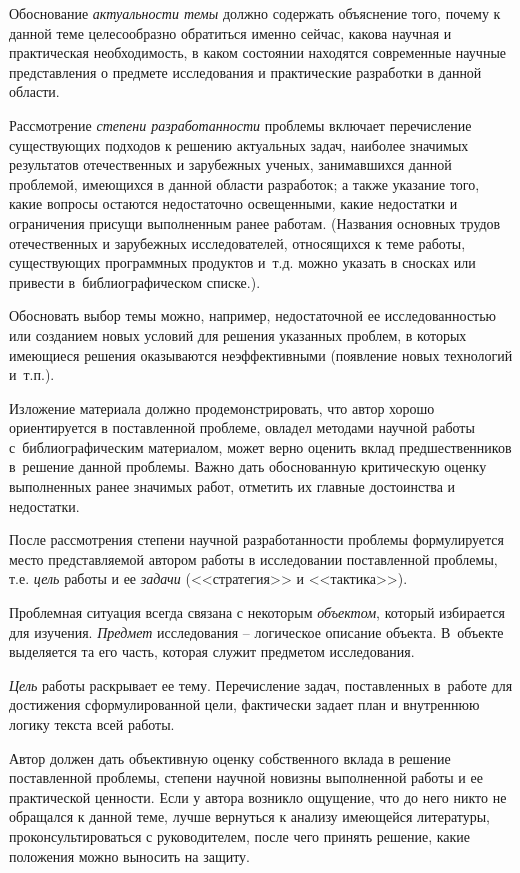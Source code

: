 \documentclass[PI,VKR]{HSEUniversity}
\begin{document}
Обоснование \emph{актуальности темы} должно содержать объяснение того, почему к данной теме целесообразно обратиться именно сейчас, какова научная и практическая необходимость, в каком состоянии находятся современные научные представления о предмете исследования и практические разработки в данной области.

Рассмотрение \emph{степени разработанности} проблемы включает перечисление существующих подходов к решению актуальных задач, наиболее значимых результатов отечественных и зарубежных ученых, занимавшихся данной проблемой, имеющихся в данной области разработок; а также указание того, какие вопросы остаются недостаточно освещенными, какие недостатки и ограничения присущи выполненным ранее работам. (Названия основных трудов отечественных и зарубежных исследователей, относящихся к теме работы, существующих программных продуктов и т.д. можно указать в сносках или привести в библиографическом списке.).

Обосновать выбор темы можно, например, недостаточной ее исследованностью или созданием новых условий для решения указанных проблем, в которых имеющиеся решения оказываются неэффективными (появление новых технологий и т.п.).

Изложение материала должно продемонстрировать, что автор хорошо ориентируется в поставленной проблеме, овладел методами научной работы с библиографическим материалом, может верно оценить вклад предшественников в решение данной проблемы. Важно дать обоснованную критическую оценку выполненных ранее значимых работ, отметить их главные достоинства и недостатки. 

После рассмотрения степени научной разработанности проблемы формулируется место представляемой автором работы в исследовании поставленной проблемы, т.е. \emph{цель} работы и ее \emph{задачи} (<<стратегия>> и <<тактика>>).

Проблемная ситуация всегда связана с некоторым \emph{объектом}, который избирается для изучения. \emph{Предмет} исследования – логическое описание объекта. В объекте выделяется та его часть, которая служит предметом исследования.

\emph{Цель} работы раскрывает ее тему. Перечисление задач, поставленных в работе для достижения сформулированной цели, фактически задает план и внутреннюю логику текста всей работы. 

Автор должен дать объективную оценку собственного вклада в решение поставленной проблемы, степени научной новизны выполненной работы и ее практической ценности. Если у автора возникло ощущение, что до него никто не обращался к данной теме, лучше вернуться к анализу имеющейся литературы, проконсультироваться с руководителем, после чего принять решение, какие положения можно выносить на защиту. 
\end{document}
